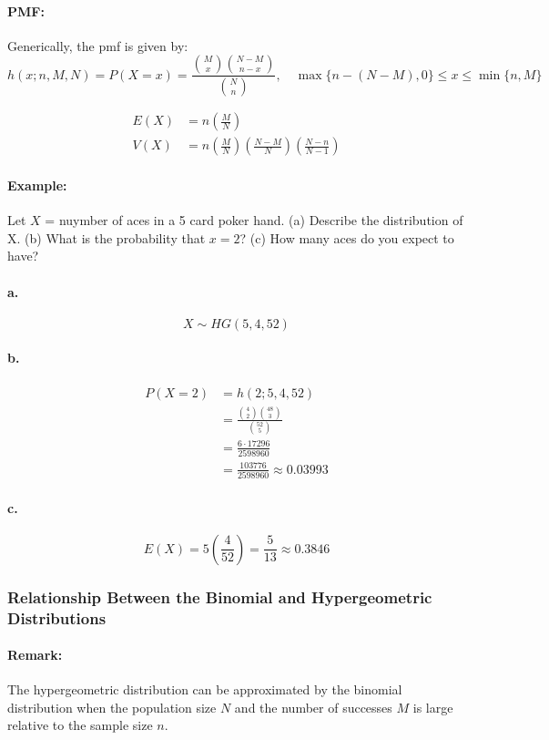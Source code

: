 \paragraph*{PMF:}
Generically, the pmf is given by:
\[
    h(x; n, M, N) = P(X=x) = \frac{\binom{M}{x} \binom{N-M}{n-x}}{\binom{N}{n}}, \quad \max\{n - (N-M), 0\} \leq x \leq \min\{n, M\}
\]

\begin{align*}
    E(X) &= n \left(\frac{M}{N}\right) \\
    V(X) &= n \left(\frac{M}{N}\right) \left(\frac{N-M}{N}\right) \left(\frac{N-n}{N-1}\right)
\end{align*}

\paragraph*{Example:}
Let $X$ = nuymber of aces in a 5 card poker hand. (a) Describe the distribution of X. (b) What is the probability that $x=2$?
(c) How many aces do you expect to have?

\paragraph*{a.}
\[
    X \sim HG(5, 4, 52)
\]

\paragraph*{b.}
\begin{align*}
    P(X=2) &= h(2; 5, 4, 52) \\
    &= \frac{\binom{4}{2} \binom{48}{3}}{\binom{52}{5}} \\
    &= \frac{6 \cdot 17296}{2598960} \\
    &= \frac{103776}{2598960} \approx 0.03993
\end{align*}

\paragraph*{c.}
\[
    E(X) = 5 \left(\frac{4}{52}\right) = \frac{5}{13} \approx 0.3846
\]

\subsubsection*{Relationship Between the Binomial and Hypergeometric Distributions}
\paragraph*{Remark:}
The hypergeometric distribution can be approximated by the binomial distribution when the population size $N$ and the 
number of successes $M$ is large relative to the sample size $n$.
